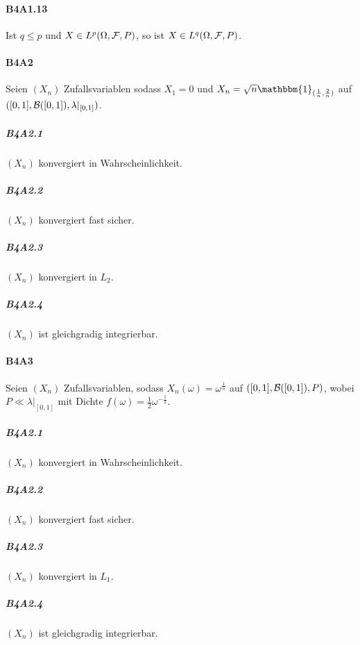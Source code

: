 \documentclass{article}
\begin{document}
\paragraph{B4A1.13}
Ist $q\leq p$ und $X\in L^p(\Omega,{\cal F},P)$, so ist $X\in L^q(\Omega,{\cal F},P)$.
\newpage

\paragraph{B4A2}
Seien $(X_n)$ Zufallsvariablen sodass $X_1=0$ und $X_n=\sqrt{n}\mathbbm{1}_{(\frac{1}{n},\frac{2}{n})}$ auf $([0,1],{\cal B}([0,1]),\lambda|_{[0,1]})$.
\subparagraph{B4A2.1} $(X_n)$ konvergiert in Wahrscheinlichkeit.

\subparagraph{B4A2.2} $(X_n)$ konvergiert fast sicher.

\subparagraph{B4A2.3} $(X_n)$ konvergiert in $L_2$.

\subparagraph{B4A2.4} $(X_n)$ ist gleichgradig integrierbar.
\newpage

\paragraph{B4A3} Seien $(X_n)$ Zufallsvariablen, sodass $X_n(\omega)=\omega^{\frac{1}{n}}$ auf $([0,1],{\cal B}([0,1]),P)$, wobei $P\ll\lambda|_{[0,1]}$ mit Dichte $f(\omega)=\frac{1}{2}\omega^{-\frac{1}{2}}$.
\subparagraph{B4A2.1} $(X_n)$ konvergiert in Wahrscheinlichkeit.

\subparagraph{B4A2.2} $(X_n)$ konvergiert fast sicher.

\subparagraph{B4A2.3} $(X_n)$ konvergiert in $L_1$.

\subparagraph{B4A2.4} $(X_n)$ ist gleichgradig integrierbar.
\newpage


\end{document}
